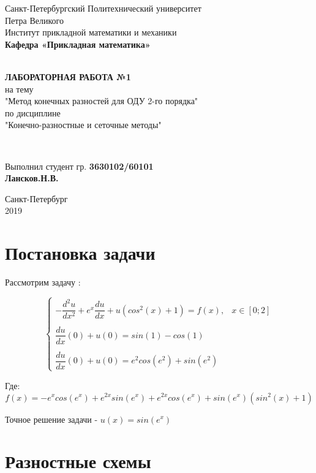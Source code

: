 \documentclass[12pt]{article}
\renewcommand{\listoffigures}{\begingroup  %
\tocsection
\tocfile{\listfigurename}{lof}
\endgroup}
\renewcommand{\listoftables}{\begingroup  %
\tocsection
\tocfile{\listtablename}{lot}
\endgroup}
\begin{document}
\begin{titlepage}
	\center
		Санкт-Петербургский Политехнический 
		университет \\ Петра Великого\\
		Институт прикладной математики и механики
		\\ \textbf{Кафедра «Прикладная математика»}

	\vfill ~
	\textbf{
		\\ \large ЛАБОРАТОРНАЯ РАБОТА №1
	}
	\\	на тему 
	\\ "Метод конечных разностей для ОДУ 2-го порядка"
	\\ по дисциплине
	\\ "Конечно-разностные и сеточные методы"

	\vfill ~

	Выполнил студент гр. \textbf{3630102/60101} \\
	\textbf{Лансков.Н.В.} \\ 

\vfill

{\large}	Санкт-Петербург
\\ 2019
\end{titlepage}


\tableofcontents 
\newpage
\listoffigures
\newpage
\listoftables
\newpage

\section{Постановка задачи}

Рассмотрим задачу :

$$
\begin{cases}
-\dfrac{d^2u}{dx^2} + e^x\dfrac{du}{dx} + u(cos^2(x) + 1) = f(x), & x \in [0;2] \\ \\
\dfrac{du}{dx}(0) + u(0) = sin(1) - cos(1) \\ \\
\dfrac{du}{dx}(0) + u(0) = e^2cos(e^2) + sin(e^2)
\end{cases}
$$

Где:
$$
f(x) = -e^xcos(e^x) + e^{2x}sin(e^x) + e^{2x}cos(e^x) + sin(e^x)(sin^2(x) + 1)
$$

Точное решение задачи - $u(x) = sin(e^x)$ 
\section{Разностные схемы}
\end{document}
